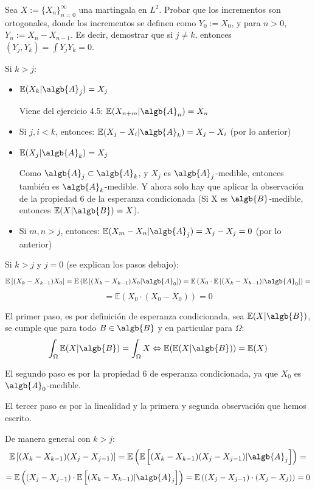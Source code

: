 \begin{problem}[2] Sea $X := \{X_n\}_{n=0}^{\infty}$   una martingala en $L^2$. Probar que los incrementos 
son ortogonales, donde los incrementos se definen como $Y_0 := X_0$, y 
para $n > 0$, $Y_n := X_n - X_{n-1}$. Es decir, demostrar que si $j\ne k$, entonces
$(Y_j, Y_k) = \int Y_j Y_k = 0$. 
\solution

\begin{expla}

\obs Si $k>j$:
\begin{itemize}
\item $\mathbb{E}(X_k|\algb{A}_j) = X_j$

Viene del ejercicio 4.5: $\mathbb{E}(X_{n+m}|\algb{A}_n)=X_n$

\item Si $j,i < k$, entonces: $\mathbb{E}(X_j-X_i|\algb{A}_k)=X_j-X_i$  (por lo anterior)

\item $\mathbb{E}(X_j|\algb{A}_k) = X_j$

Como $\algb{A}_j \subset \algb{A}_k$, y $X_j$ es $\algb{A}_j$-medible, entonces también es $\algb{A}_k$-medible. Y ahora solo hay que aplicar la observación de la propiedad 6 de la esperanza condicionada (Si X es $\algb{B}$-medible, entonces $\mathbb{E}(X|\algb{B})=X$). 

\item Si $m,n > j$, entonces: $\mathbb{E}(X_m-X_n|\algb{A}_j)=X_j-X_j=0$  (por lo anterior)
\end{itemize}
\end{expla}



Si $k>j$ y $j=0$ (se explican los pasos debajo):
\[
\mathbb{E}\left[(X_k-X_{k-1})X_0\right] = \mathbb{E}\left( \mathbb{E}\left[(X_k-X_{k-1})X_0|\algb{A}_0\right]\right)= \mathbb{E}\left(X_0 \cdot \mathbb{E}\left[(X_k-X_{k-1})|\algb{A}_0\right]\right) =
\]
\[
= \mathbb{E}\left(X_0 \cdot (X_0-X_0)\right)  = 0
\]

El primer paso, es por definición de esperanza condicionada, sea $\mathbb{E}(X|\algb{B})$, se cumple que para todo $B \in \algb{B}$ y en particular para $\Omega$:
\[
\int_{\Omega}\mathbb{E}(X|\algb{B}) = \int_{\Omega}X \Leftrightarrow \mathbb{E}(\mathbb{E}(X|\algb{B})) = \mathbb{E}(X)
\]

El segundo paso es por la propiedad 6 de esperanza condicionada, ya que $X_0$ es $\algb{A}_0$-medible.

El tercer paso es por la linealidad y la primera y segunda observación que hemos escrito.


De manera general con $k>j$:
\[
\mathbb{E}\left[(X_k-X_{k-1})(X_j-X_{j-1})\right] = \mathbb{E}\left( \mathbb{E}\left[(X_k-X_{k-1})(X_j-X_{j-1})|\algb{A}_j\right]\right) =
\]
\[
= \mathbb{E}\left((X_j-X_{j-1}) \cdot \mathbb{E}\left[(X_k-X_{k-1})|\algb{A}_j\right]\right)= \mathbb{E}\left((X_j-X_{j-1}) \cdot (X_j-X_j)\right)  = 0
\]



\end{problem}

